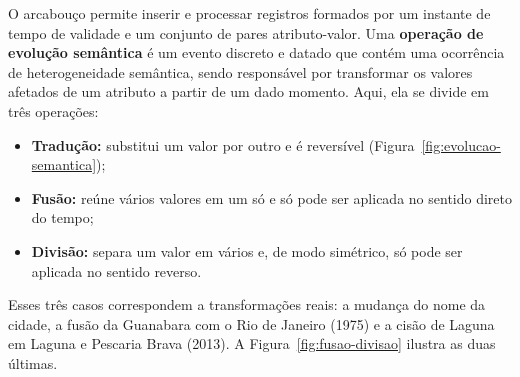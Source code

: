 O arcabouço permite inserir e processar registros formados por um instante de tempo de validade e um conjunto de pares atributo-valor. Uma \textbf{operação de evolução semântica} é um evento discreto e datado que contém uma ocorrência de heterogeneidade semântica, sendo responsável por transformar os valores afetados de um atributo a partir de um dado momento. Aqui, ela se divide em três operações:

\begin{itemize}
  \item \textbf{Tradução:} substitui um valor por outro e é reversível (Figura~\ref{fig:evolucao-semantica});
  \item \textbf{Fusão:} reúne vários valores em um só e só pode ser aplicada no sentido direto do tempo;
  \item \textbf{Divisão:} separa um valor em vários e, de modo simétrico, só pode ser aplicada no sentido reverso.
\end{itemize}

Esses três casos correspondem a transformações reais: a mudança do nome da cidade, a fusão da Guanabara com o Rio de Janeiro (1975) e a cisão de Laguna em Laguna e Pescaria Brava (2013). A Figura~\ref{fig:fusao-divisao} ilustra as duas últimas.

